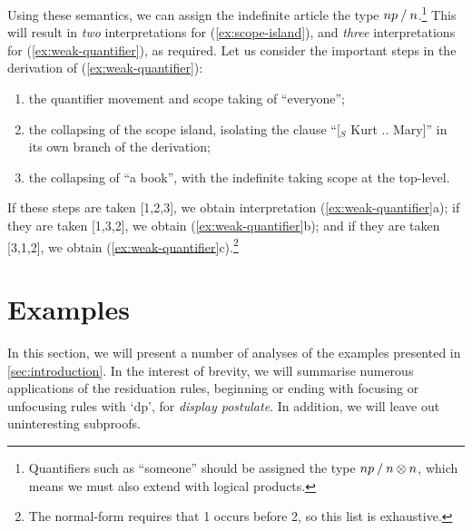 \documentclass[10pt,a4paper]{llncs}
\begin{document}
Using these semantics, we can assign the indefinite article the type
$np \mathbin{\slash} n$.\footnote{%
  Quantifiers such as ``someone'' should be assigned the type $np\mathbin{\slash}
  n\otimes n$, which means we must also extend {\NLCL} with logical
  products.
}
This will result in \emph{two} interpretations for
(\ref{ex:scope-island}), and \emph{three} interpretations for
(\ref{ex:weak-quantifier}), as required. Let us consider the
important steps in the derivation of (\ref{ex:weak-quantifier}):
\begin{enumerate}
\item the quantifier movement and scope taking of ``everyone'';
\item the collapsing of the scope island, isolating the clause
  ``[$_S$ Kurt .. Mary]'' in its own branch of the derivation;
\item the collapsing of ``a book'', with the indefinite taking scope
  at the top-level.
\end{enumerate}
If these steps are taken [1,2,3], we obtain interpretation
(\ref{ex:weak-quantifier}a); if they are taken [1,3,2], we obtain
(\ref{ex:weak-quantifier}b); and if they are taken [3,1,2], we obtain
(\ref{ex:weak-quantifier}c).\footnote{%
  The normal-form requires that 1 occurs before 2, so this list is
  exhaustive.
}

\section{Examples}

In this section, we will present a number of analyses of the examples
presented in \autoref{sec:introduction}. In the interest of brevity,
we will summarise numerous applications of the residuation rules,
beginning or ending with focusing or unfocusing rules with `dp', for
\emph{display postulate}.
In addition, we will leave out uninteresting subproofs.
\end{document}

